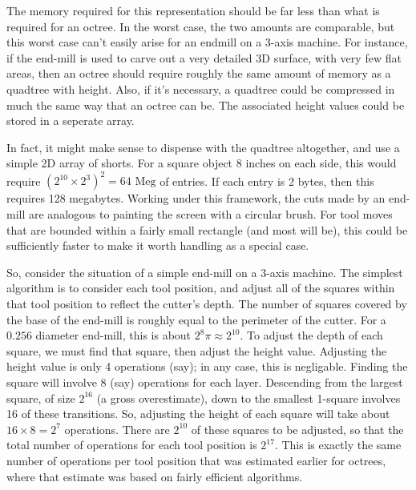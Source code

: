 \documentclass[titlepage,oneside,10pt]{article}
\begin{document}
The memory required for this representation should be far less than
what is required for an octree. In the worst case, the two amounts are
comparable, but this worst case can't easily arise for an endmill on a
3-axis machine. For instance, if the end-mill is used to carve out a
very detailed 3D surface, with very few flat areas, then an octree
should require roughly the same amount of memory as a quadtree with
height. Also, if it's necessary, a quadtree could be compressed in
much the same way that an octree can be. The associated height values
could be stored in a seperate array.

In fact, it might make sense to dispense with the quadtree
altogether, and use a simple 2D array of shorts. For a square object 8
inches on each side, this would require $(2^{10}\times 2^3)^2 =
64\mbox{ Meg}$ of entries. If each entry is 2 bytes, then this
requires 128 megabytes. Working under this framework, the cuts made by
an end-mill are analogous to painting the screen with a circular
brush. For tool moves that are bounded within a fairly small rectangle
(and most will be), this could be sufficiently faster to make it worth
handling as a special case.

So, consider the situation of a simple end-mill on a 3-axis
machine. The simplest algorithm is to consider each tool position, and
adjust all of the squares within that tool position to reflect the
cutter's depth. The number of squares covered by the base of the
end-mill is roughly equal to the perimeter of the cutter. For a
$0.256$ diameter end-mill, this is about $2^8\pi\approx 2^{10}$. To
adjust the depth of each square, we must find that square, then adjust
the height value. Adjusting the height value is only 4 operations
(say); in any case, this is negligable. Finding the square will
involve 8 (say) operations for each layer. Descending from the largest
square, of size $2^{16}$ (a gross overestimate), down to the smallest
1-square involves 16 of these transitions. So, adjusting the height of each
square will take about $16\times 8 = 2^7$ operations. There are
$2^{10}$ of these squares to be adjusted, so that the total number of
operations for each tool position is $2^{17}$. This is exactly the
same number of operations per tool position that was estimated earlier
for octrees, where that estimate was based on fairly efficient algorithms.
\end{document}
